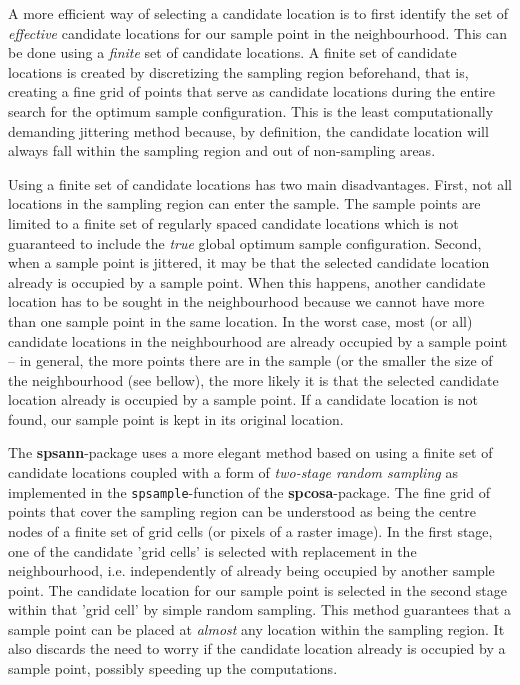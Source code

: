 A more efficient way of selecting a candidate location is to first identify the
set of \textit{effective} candidate locations for our sample point in the 
neighbourhood. This can be done using a \textit{finite} set of candidate 
locations. A finite set of candidate locations is created by discretizing the 
sampling region beforehand, that is, creating a fine grid of points that serve 
as candidate locations during the entire search for the optimum sample 
configuration. This is the least computationally demanding jittering method 
because, by definition, the candidate location will always fall within the 
sampling region and out of non-sampling areas.

Using a finite set of candidate locations has two main disadvantages. First, not
all locations in the sampling region can enter the sample. The sample points are
limited to a finite set of regularly spaced candidate locations which is not 
guaranteed to include the \textit{true} global optimum sample configuration. 
Second, when a sample point is jittered, it may be that the selected candidate 
location already is occupied by a sample point. When this happens, another 
candidate location has to be sought in the neighbourhood because we cannot have 
more than one sample point in the same location. In the worst case, most (or 
all) candidate locations in the neighbourhood are already occupied by a sample 
point -- in general, the more points there are in the sample (or the smaller 
the size of the neighbourhood (see bellow), the more likely it is that the 
selected candidate location already is occupied by a sample point. If a 
candidate location is not found, our sample point is kept in its original 
location.

The \textbf{spsann}-package uses a more elegant method based on using a finite
set of candidate locations coupled with a form of \textit{two-stage random 
sampling} as implemented in the \texttt{spsample}-function of the 
\textbf{spcosa}-package. The fine grid of points that cover the sampling region
can be understood as being the centre nodes of a finite set of grid cells (or 
pixels of a raster image). In the first stage, one of the candidate 'grid cells'
is selected with replacement in the neighbourhood, i.e. independently of already
being occupied by another sample point. The candidate location for our sample 
point is selected in the second stage within that 'grid cell' by simple random 
sampling. This method guarantees that a sample point can be placed at 
\textit{almost} any location within the sampling region. It also discards the 
need to worry if the candidate location already is occupied by a sample point, 
possibly speeding up the computations.


